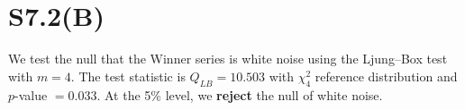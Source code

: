 \documentclass{article}
\begin{document}
\section*{S7.2(B)}
We test the null that the Winner series is white noise using the Ljung--Box test with $m=4$. 
The test statistic is $Q_{LB} = 10.503$ with $\chi^2_4$ reference distribution and 
$p$-value $= 0.033$. 
At the 5\% level, we 
\textbf{reject} the null of white noise.
\end{document}
